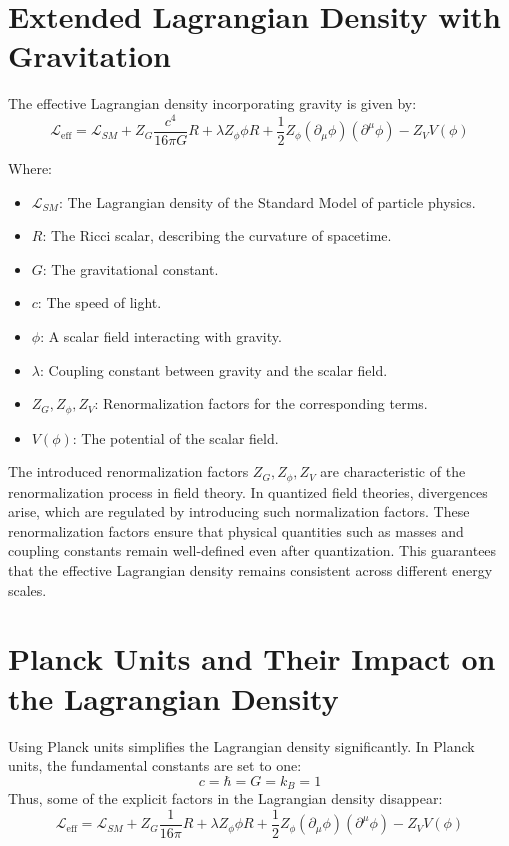 \documentclass[a4paper,11pt]{article}
\begin{document}
	\section{Extended Lagrangian Density with Gravitation}
	The effective Lagrangian density incorporating gravity is given by:
	\begin{equation}
		\mathcal{L}_{\text{eff}} = \mathcal{L}_{SM} + Z_G \frac{c^4}{16\pi G} R + \lambda Z_\phi \phi R + \frac{1}{2} Z_\phi (\partial_\mu \phi)(\partial^\mu \phi) - Z_V V(\phi)
	\end{equation}
	
	Where:
	\begin{itemize}
		\item $\mathcal{L}_{SM}$: The Lagrangian density of the Standard Model of particle physics.
		\item $R$: The Ricci scalar, describing the curvature of spacetime.
		\item $G$: The gravitational constant.
		\item $c$: The speed of light.
		\item $\phi$: A scalar field interacting with gravity.
		\item $\lambda$: Coupling constant between gravity and the scalar field.
		\item $Z_G, Z_\phi, Z_V$: Renormalization factors for the corresponding terms.
		\item $V(\phi)$: The potential of the scalar field.
	\end{itemize}
	
	The introduced renormalization factors $Z_G, Z_\phi, Z_V$ are characteristic of the renormalization process in field theory. In quantized field theories, divergences arise, which are regulated by introducing such normalization factors. These renormalization factors ensure that physical quantities such as masses and coupling constants remain well-defined even after quantization. This guarantees that the effective Lagrangian density remains consistent across different energy scales.
	
	\section{Planck Units and Their Impact on the Lagrangian Density}
	Using Planck units simplifies the Lagrangian density significantly. In Planck units, the fundamental constants are set to one:
	\begin{equation}
		c = \hbar = G = k_B = 1
	\end{equation}
	Thus, some of the explicit factors in the Lagrangian density disappear:
	\begin{equation}
		\mathcal{L}_{\text{eff}} = \mathcal{L}_{SM} + Z_G \frac{1}{16\pi} R + \lambda Z_\phi \phi R + \frac{1}{2} Z_\phi (\partial_\mu \phi)(\partial^\mu \phi) - Z_V V(\phi)
	\end{equation}
	
\end{document}
